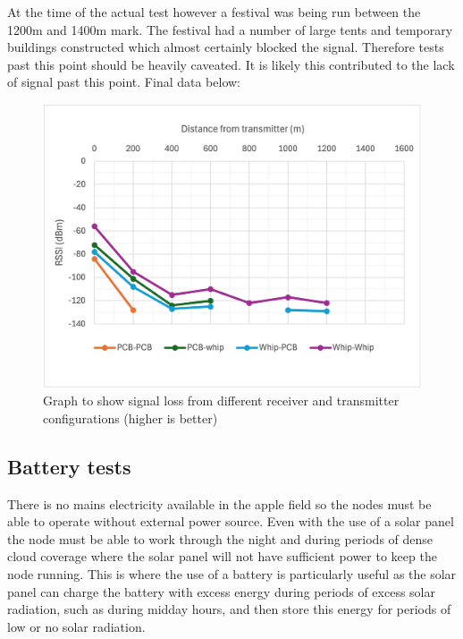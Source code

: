 At the time of the actual test however a festival was being run between the
1200m and 1400m mark. The festival had a number of large tents and temporary
buildings constructed which almost certainly blocked the signal. Therefore tests
past this point should be heavily caveated. It is likely this contributed to the
lack of signal past this point. Final data below:

\begin{figure}[H]
    \centering
    \includegraphics[width=1\textwidth]{contents/23-hw-development/23-fig/distance-graph.jpg}
    \caption{Graph to show signal loss from different receiver and transmitter configurations (higher is better)}
    \label{fig:range-test-elevation}
\end{figure}

\subsection{Battery tests}

There is no mains electricity available in the apple field so the nodes must be
able to operate without external power source. Even with the use of a solar
panel the node must be able to work through the night and during periods of
dense cloud coverage where the solar panel will not have sufficient power to
keep the node running. This is where the use of a battery is particularly useful
as the solar panel can charge the battery with excess energy during periods of
excess solar radiation, such as during midday hours, and then store this energy
for periods of low or no solar radiation.

